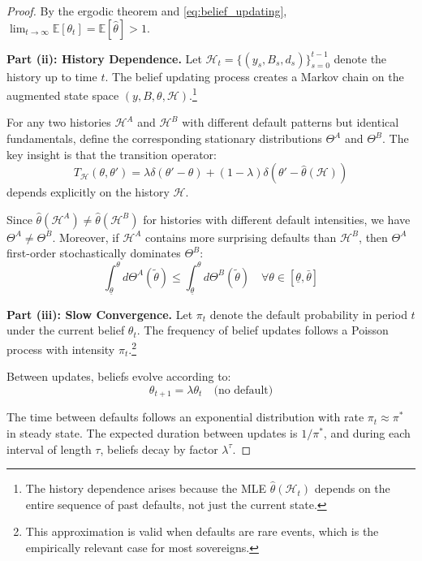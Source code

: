 \documentclass[12pt]{article}
\theoremstyle{plain}
\begin{document}
\begin{proof}
	By the ergodic theorem and \eqref{eq:belief_updating}, $\lim_{t \to \infty}
		\mathbb{E}[\theta_t] = \mathbb{E}[\hat{\theta}] > 1$.

	\textbf{Part (ii): History Dependence.}
	Let $\mathcal{H}_t = \{(y_s, B_s, d_s)\}_{s=0}^{t-1}$ denote the history up to time $t$. The belief updating process creates a Markov chain on the augmented state space $(y, B, \theta, \mathcal{H})$.\footnote{The history dependence arises because the MLE $\hat{\theta}(\mathcal{H}_t)$ depends on the entire sequence of past defaults, not just the current state.}

	For any two histories $\mathcal{H}^A$ and $\mathcal{H}^B$ with different
	default patterns but identical fundamentals, define the corresponding
	stationary distributions $\Theta^A$ and $\Theta^B$. The key insight is that the
	transition operator:
	\begin{equation}
		T_{\mathcal{H}}(\theta, \theta') = \lambda \delta(\theta' - \theta) + (1-\lambda) \delta(\theta' - \hat{\theta}(\mathcal{H}))
		\label{eq:transition_operator}
	\end{equation}
	depends explicitly on the history $\mathcal{H}$.

	Since $\hat{\theta}(\mathcal{H}^A) \neq \hat{\theta}(\mathcal{H}^B)$ for
	histories with different default intensities, we have $\Theta^A \neq \Theta^B$.
	Moreover, if $\mathcal{H}^A$ contains more surprising defaults than
	$\mathcal{H}^B$, then $\Theta^A$ first-order stochastically dominates
	$\Theta^B$:
	\begin{equation}
		\int_{\underline{\theta}}^{\theta} d\Theta^A(\tilde{\theta}) \leq \int_{\underline{\theta}}^{\theta} d\Theta^B(\tilde{\theta}) \quad \forall \theta \in [\underline{\theta}, \bar{\theta}] \label{eq:stochastic_dominance}
	\end{equation}

	\textbf{Part (iii): Slow Convergence.}
	Let $\pi_t$ denote the default probability in period $t$ under the current belief $\theta_t$. The frequency of belief updates follows a Poisson process with intensity $\pi_t$.\footnote{This approximation is valid when defaults are rare events, which is the empirically relevant case for most sovereigns.}

	Between updates, beliefs evolve according to:
	\begin{equation}
		\theta_{t+1} = \lambda \theta_t \quad \text{(no default)} \label{eq:belief_decay}
	\end{equation}

	The time between defaults follows an exponential distribution with rate $\pi_t
		\approx \pi^*$ in steady state. The expected duration between updates is
	$1/\pi^*$, and during each interval of length $\tau$, beliefs decay by factor
	$\lambda^\tau$.


\end{proof}
\end{document}
